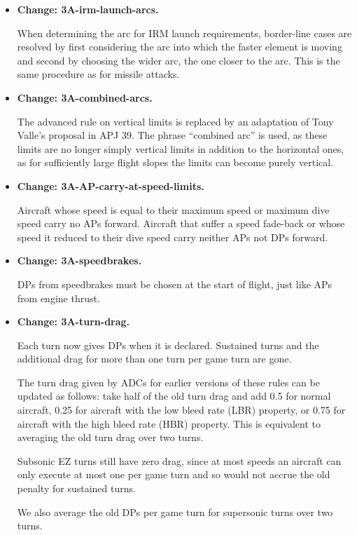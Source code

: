 \documentclass{report}
\newcommand{\changetag}[1]{\textbf{Change: #1.}\par}
\begin{document}
\begin{itemize}
    \item\changetag{3A-irm-launch-arcs}

        When determining the arc for IRM launch requirements, border-line cases are resolved by first considering the arc into which the faster element is moving and second by choosing the wider arc, the one closer to the  arc. This is the same procedure as for missile attacks.

    \item\changetag{3A-combined-arcs}

        The advanced rule on vertical limits is replaced by an adaptation of Tony Valle's proposal in APJ 39. The phrase “combined arc” is used, as these limits are no longer simply vertical limits in addition to the horizontal ones, as for sufficiently large flight slopes the limits can become purely vertical.

    \item\changetag{3A-AP-carry-at-speed-limits}

        Aircraft whose speed is equal to their maximum speed or maximum dive speed carry no APs forward. Aircraft that suffer a speed fade-back or whose speed it reduced to their dive speed carry neither APs not DPs forward.

    \item\changetag{3A-speedbrakes}

        DPs from speedbrakes must be chosen at the start of flight, just like APs from engine thrust.

    \item\changetag{3A-turn-drag}

        Each turn now gives DPs when it is declared. Sustained turns and the additional drag for more than one turn per game turn are gone.

        The turn drag given by ADCs for earlier versions of these rules can be updated as follows: take half of the old turn drag and add 0.5 for normal aircraft, 0.25 for aircraft with the low bleed rate (LBR) property, or 0.75 for aircraft with the high bleed rate (HBR) property. This is equivalent to averaging the old turn drag over two turns.

        Subsonic EZ turns still have zero drag, since at most speeds an aircraft can only execute at most one per game turn and so would not accrue the old penalty for sustained turns.

        We also average the old DPs per game turn for supersonic turns over two turns.


\end{itemize}
\end{document}
